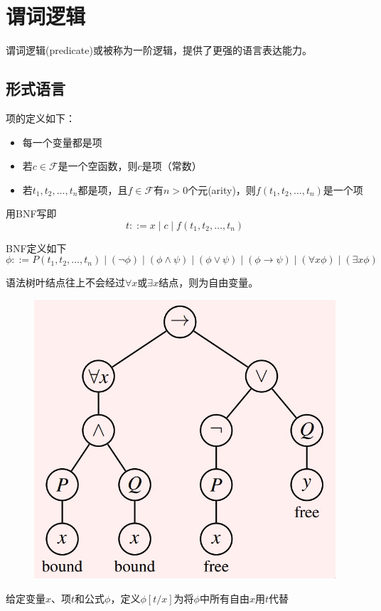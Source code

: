 
\section{谓词逻辑}
谓词逻辑(predicate)或被称为一阶逻辑，提供了更强的语言表达能力。

\subsection{形式语言}
\begin{definition}[项(item)]
项的定义如下：
\begin{itemize}
	\item 每一个变量都是项
	\item 若$c\in\mathcal{F}$是一个空函数，则$c$是项（常数）
	\item 若$t_1,t_2,\ldots,t_n$都是项，且$f\in\mathcal{F}$有$n>0$个元(arity)，则$f(t_1,t_2,\ldots,t_n)$是一个项
\end{itemize}
用BNF写即
\[t::=x\mid c\mid f(t_1,t_2,\ldots,t_n)\]
\end{definition}
\begin{definition}[公式(formula)]
BNF定义如下
\[\phi::=P(t_1,t_2,\ldots,t_n)\mid
(\lnot\phi)\mid
(\phi\land\psi)\mid
(\phi\lor\psi)\mid
(\phi\to\psi)\mid
(\forall x\phi)\mid
(\exists x\phi)\]
\end{definition}
\begin{definition}
语法树叶结点往上不会经过$\forall x$或$\exists x$结点，则为自由变量。
\begin{figure}[H]
\centering
\includegraphics[width=0.5\linewidth]{fig/free_bound_var.jpg}
\end{figure}
\end{definition}
\begin{definition}[替代(substituion)]
给定变量$x$、项$t$和公式$\phi$，定义$\phi[t/x]$为将$\phi$中所有自由$x$用$t$代替
\end{definition}

